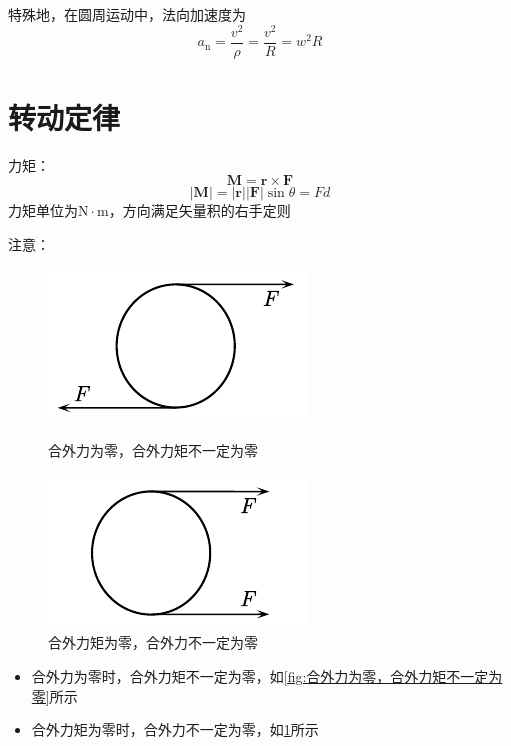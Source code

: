 \documentclass[12pt, a4paper, twoside]{ctexbook}
\begin{document}
特殊地，在圆周运动中，法向加速度为
$$
a_\mathrm{n}=\frac{v^2}{\rho}=\frac{v^2}{R}=w^2R
$$
\section{转动定律}
{\sonti 力矩}：
$$
\boldsymbol{M}=\boldsymbol{r}\times\boldsymbol{F}
$$
$$
\left|\boldsymbol{M}\right|=\left|\boldsymbol{r}\right|\left|\boldsymbol{F}\right|\sin\theta=Fd
$$
力矩单位为$\mathrm{N}\cdot\mathrm{m}$，方向满足矢量积的右手定则

{\sonti 注意}：
\begin{figure}[H]
    \centering
    \begin{minipage}{0.48\linewidth}
        \centering
        \includegraphics[width=0.6\linewidth]{合外力为零，合外力矩不一定为零.pdf}
        \caption{合外力为零，合外力矩不一定为零}
        \label{fig:合外力为零，合外力矩不一定为零}
    \end{minipage}
    \begin{minipage}{0.48\linewidth}
        \centering
        \includegraphics[width=0.6\linewidth]{合外力矩为零，合外力不一定为零.pdf}
        \caption{合外力矩为零，合外力不一定为零}
        \label{fig:合外力矩为零，合外力不一定为零}
    \end{minipage}
\end{figure}
\begin{itemize}
    \item 合外力为零时，合外力矩不一定为零，如\textcolor{blue}{\cref{fig:合外力为零，合外力矩不一定为零}}所示
    \item 合外力矩为零时，合外力不一定为零，如\textcolor{blue}{\cref{fig:合外力矩为零，合外力不一定为零}}所示
\end{itemize}
\end{document}
